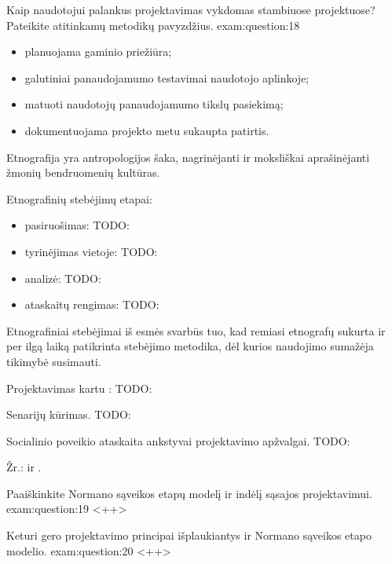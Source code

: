 \begin{question}{%
  Kaip naudotojui palankus projektavimas vykdomas stambiuose projektuose?
  Pateikite atitinkamų metodikų pavyzdžius.
  }{exam:question:18}
\begin{enumerate}
      \begin{itemize}
        \item planuojama gaminio priežiūra;
        \item galutiniai panaudojamumo testavimai naudotojo aplinkoje;
        \item matuoti naudotojų panaudojamumo tikslų pasiekimą;
        \item dokumentuojama projekto metu sukaupta patirtis.
      \end{itemize}
  \end{enumerate}

  Etnografija yra antropologijos šaka, nagrinėjanti ir moksliškai
  aprašinėjanti žmonių bendruomenių kultūras.

  Etnografinių stebėjimų etapai:
  \begin{itemize}
    \item pasiruošimas:
      TODO: \cite[52]{skaidres-7}
    \item tyrinėjimas vietoje:
      TODO: \cite[52]{skaidres-7}
    \item analizė:
      TODO: \cite[53]{skaidres-7}
    \item ataskaitų rengimas:
      TODO: \cite[53]{skaidres-7}
  \end{itemize}
  Etnografiniai stebėjimai iš esmės svarbūs tuo, kad remiasi etnografų
  sukurta ir per ilgą laiką patikrinta stebėjimo metodika, dėl kurios
  naudojimo sumažėja tikimybė susimauti.

  Projektavimas kartu :
  TODO: \cite[55--56]{skaidres-7}

  Senarijų kūrimas. TODO: \cite[57]{skaidres-7}

  Socialinio poveikio ataskaita ankstyvai projektavimo apžvalgai.
  TODO: \cite[58]{skaidres-7}

  Žr.: \cite[36--]{skaidres-7} ir \cite[165--]{konspektas}.
\end{question}

\begin{question}{%
  Paaiškinkite Normano sąveikos etapų modelį ir indėlį sąsajos
  projektavimui.
  }{exam:question:19}
  <++>
\end{question}

\begin{question}{%
  Keturi gero projektavimo principai išplaukiantys ir Normano sąveikos
  etapo modelio.
  }{exam:question:20}
  <++>
\end{question}
